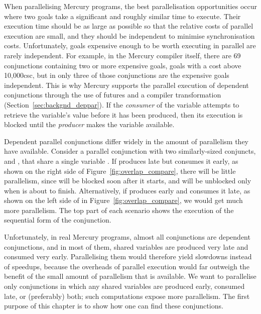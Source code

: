 When parallelising Mercury programs,
the best parallelisation opportunities occur
where two goals take a significant and roughly similar time to execute.
Their execution time should be as large as possible
so that the relative costs of parallel execution are small,
and they should be independent to minimise synchronisation costs.
Unfortunately, goals expensive enough to be worth executing in parallel
are rarely independent.
For example, in the Mercury compiler itself,
there are 69 conjunctions containing two or more expensive goals,
goals with a cost above 10,000csc,
but in only three of those conjunctions are the expensive goals independent.
This is why Mercury supports the parallel execution of dependent conjunctions
through the use of futures and a compiler transformation
\citep{wang:2006:hons, wang:2011:dep-par} (Section~\ref{sec:backgnd_deppar}).
If the \emph{consumer} of the variable attempts to retrieve the variable's value
before it has been produced, then its execution is blocked
until the \emph{producer} makes the variable available.


Dependent parallel conjunctions differ widely
in the amount of parallelism they have available.
Consider a parallel conjunction with two similarly-sized conjuncts,
 and , that share a single variable .
If  produces  late but  consumes it early,
as shown on the right side of Figure~\ref{fig:overlap_compare},
there will be little parallelism,
since  will be blocked soon after it starts,
and will be unblocked only when  is about to finish.
Alternatively, if  produces  early
and  consumes it late,
as shown on the left side of in Figure~\ref{fig:overlap_compare},
we would get much more parallelism.
The top part of each scenario
shows the execution of the sequential form of the conjunction.

Unfortunately, in real Mercury programs,
almost all conjunctions are dependent conjunctions,
and in most of them,
shared variables are produced very late and consumed very early.
Parallelising them would therefore yield slowdowns instead of speedups,
because the overheads of parallel execution would far outweigh the
benefit of the small amount of parallelism that is available.
We want to parallelise only conjunctions
in which any shared variables are produced early, consumed late,
or (preferably) both;
such computations expose more parallelism.
The first purpose of this chapter is to show how one can find these conjunctions.

